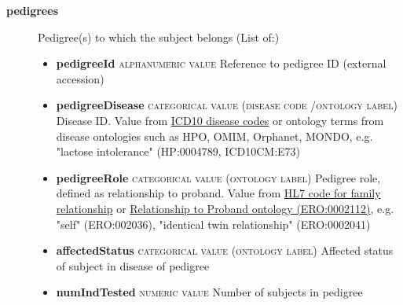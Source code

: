 \documentclass[a4paper, 10pt]{article}        %
\begin{document}
\begin{description}

	\item[\textbf{pedigrees}] Pedigree(s) to which the subject belongs (List of:)
	\begin{itemize}
			\item[] \textbf{pedigreeId} {\textsc{alphanumeric value}} Reference to pedigree ID (external accession) 
			\item[] \textbf{pedigreeDisease} {\textsc{categorical value (disease code /ontology label)}} Disease ID. Value from \href{https://www.who.int/classifications/icd/en/}{ICD10 disease codes} or ontology terms from disease ontologies such as HPO, OMIM, Orphanet, MONDO, e.g. "lactose intolerance" (HP:0004789, ICD10CM:E73)
			\item[] \textbf{pedigreeRole} {\textsc{categorical value (ontology label)}} Pedigree role, defined as relationship to proband. Value from \href{https://www.hl7.org/implement/standards/fhir/2013Sep/familial-relationship.htm}{HL7 code for family relationship} or \href{https://www.ebi.ac.uk/ols/ontologies/ero/terms?iri=http%3A%2F%2Fpurl.obolibrary.org%2Fobo%2FERO_0002112}{Relationship to Proband ontology (ERO:0002112)}, e.g. "self" (ERO:002036), "identical twin relationship" (ERO:0002041)
			\item[] \textbf{affectedStatus} {\textsc{categorical value (ontology label)}} Affected status of subject in disease of pedigree
			\item[] \textbf{numIndTested} {\textsc{numeric value}} Number of subjects in pedigree
	\end{itemize}


 \end{description}
\end{document}
